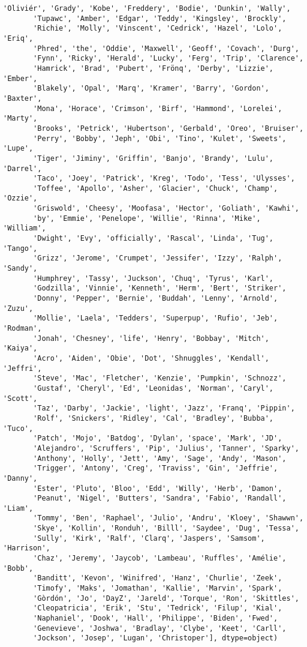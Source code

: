 \documentclass[11pt]{article}
\begin{document}
\begin{tcolorbox}[breakable, size=fbox, boxrule=.5pt, pad at break*=1mm, opacityfill=0]
\begin{Verbatim}[commandchars=\\\{\}]
       'Oliviér', 'Grady', 'Kobe', 'Freddery', 'Bodie', 'Dunkin', 'Wally',
       'Tupawc', 'Amber', 'Edgar', 'Teddy', 'Kingsley', 'Brockly',
       'Richie', 'Molly', 'Vinscent', 'Cedrick', 'Hazel', 'Lolo', 'Eriq',
       'Phred', 'the', 'Oddie', 'Maxwell', 'Geoff', 'Covach', 'Durg',
       'Fynn', 'Ricky', 'Herald', 'Lucky', 'Ferg', 'Trip', 'Clarence',
       'Hamrick', 'Brad', 'Pubert', 'Frönq', 'Derby', 'Lizzie', 'Ember',
       'Blakely', 'Opal', 'Marq', 'Kramer', 'Barry', 'Gordon', 'Baxter',
       'Mona', 'Horace', 'Crimson', 'Birf', 'Hammond', 'Lorelei', 'Marty',
       'Brooks', 'Petrick', 'Hubertson', 'Gerbald', 'Oreo', 'Bruiser',
       'Perry', 'Bobby', 'Jeph', 'Obi', 'Tino', 'Kulet', 'Sweets', 'Lupe',
       'Tiger', 'Jiminy', 'Griffin', 'Banjo', 'Brandy', 'Lulu', 'Darrel',
       'Taco', 'Joey', 'Patrick', 'Kreg', 'Todo', 'Tess', 'Ulysses',
       'Toffee', 'Apollo', 'Asher', 'Glacier', 'Chuck', 'Champ', 'Ozzie',
       'Griswold', 'Cheesy', 'Moofasa', 'Hector', 'Goliath', 'Kawhi',
       'by', 'Emmie', 'Penelope', 'Willie', 'Rinna', 'Mike', 'William',
       'Dwight', 'Evy', 'officially', 'Rascal', 'Linda', 'Tug', 'Tango',
       'Grizz', 'Jerome', 'Crumpet', 'Jessifer', 'Izzy', 'Ralph', 'Sandy',
       'Humphrey', 'Tassy', 'Juckson', 'Chuq', 'Tyrus', 'Karl',
       'Godzilla', 'Vinnie', 'Kenneth', 'Herm', 'Bert', 'Striker',
       'Donny', 'Pepper', 'Bernie', 'Buddah', 'Lenny', 'Arnold', 'Zuzu',
       'Mollie', 'Laela', 'Tedders', 'Superpup', 'Rufio', 'Jeb', 'Rodman',
       'Jonah', 'Chesney', 'life', 'Henry', 'Bobbay', 'Mitch', 'Kaiya',
       'Acro', 'Aiden', 'Obie', 'Dot', 'Shnuggles', 'Kendall', 'Jeffri',
       'Steve', 'Mac', 'Fletcher', 'Kenzie', 'Pumpkin', 'Schnozz',
       'Gustaf', 'Cheryl', 'Ed', 'Leonidas', 'Norman', 'Caryl', 'Scott',
       'Taz', 'Darby', 'Jackie', 'light', 'Jazz', 'Franq', 'Pippin',
       'Rolf', 'Snickers', 'Ridley', 'Cal', 'Bradley', 'Bubba', 'Tuco',
       'Patch', 'Mojo', 'Batdog', 'Dylan', 'space', 'Mark', 'JD',
       'Alejandro', 'Scruffers', 'Pip', 'Julius', 'Tanner', 'Sparky',
       'Anthony', 'Holly', 'Jett', 'Amy', 'Sage', 'Andy', 'Mason',
       'Trigger', 'Antony', 'Creg', 'Traviss', 'Gin', 'Jeffrie', 'Danny',
       'Ester', 'Pluto', 'Bloo', 'Edd', 'Willy', 'Herb', 'Damon',
       'Peanut', 'Nigel', 'Butters', 'Sandra', 'Fabio', 'Randall', 'Liam',
       'Tommy', 'Ben', 'Raphael', 'Julio', 'Andru', 'Kloey', 'Shawwn',
       'Skye', 'Kollin', 'Ronduh', 'Billl', 'Saydee', 'Dug', 'Tessa',
       'Sully', 'Kirk', 'Ralf', 'Clarq', 'Jaspers', 'Samsom', 'Harrison',
       'Chaz', 'Jeremy', 'Jaycob', 'Lambeau', 'Ruffles', 'Amélie', 'Bobb',
       'Banditt', 'Kevon', 'Winifred', 'Hanz', 'Churlie', 'Zeek',
       'Timofy', 'Maks', 'Jomathan', 'Kallie', 'Marvin', 'Spark',
       'Gòrdón', 'Jo', 'DayZ', 'Jareld', 'Torque', 'Ron', 'Skittles',
       'Cleopatricia', 'Erik', 'Stu', 'Tedrick', 'Filup', 'Kial',
       'Naphaniel', 'Dook', 'Hall', 'Philippe', 'Biden', 'Fwed',
       'Genevieve', 'Joshwa', 'Bradlay', 'Clybe', 'Keet', 'Carll',
       'Jockson', 'Josep', 'Lugan', 'Christoper'], dtype=object)
\end{Verbatim}
\end{tcolorbox}
        
\end{document}
